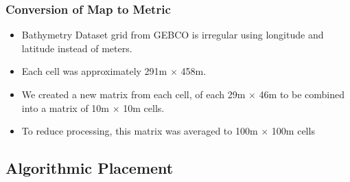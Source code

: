 \documentclass{beamer}
\begin{document}
\begin{frame}
  \frametitle{Conversion of Map to Metric}
  \begin{figure}
  \end{figure}
  \vspace{-3cm}
  \begin{itemize}
    \item Bathymetry Dataset grid from GEBCO is irregular using longitude and latitude instead of meters.\pause
    \item Each cell was approximately 291m $\times$ 458m.\pause
    \item We created a new matrix from each cell, of each 29m $\times$ 46m to be combined into a matrix of 10m $\times$ 10m cells.\pause
    \item To reduce processing, this matrix was averaged to 100m $\times$ 100m cells
  \end{itemize}
\end{frame}

\subsection{Algorithmic Placement}
\end{document}
